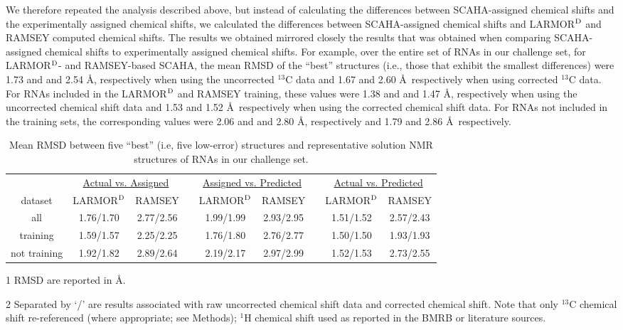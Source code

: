 \documentclass[journal=jcisd8,manuscript=article,layout=onecolumn]{achemso}
\begin{document}
{We therefore repeated  the analysis described above, but instead of calculating the differences between SCAHA-assigned chemical shifts and the experimentally assigned chemical shifts, we calculated the differences between SCAHA-assigned chemical shifts and LARMOR$^{\rm D}$ and RAMSEY computed chemical shifts. The results we obtained mirrored closely the results that was obtained when comparing SCAHA-assigned chemical shifts to experimentally assigned chemical shifts. For example, over the entire set of RNAs in our challenge set, for LARMOR$^{\rm D}$- and RAMSEY-based SCAHA, the mean RMSD of the ``best'' structures (i.e., those that exhibit the smallest differences) were 1.73 and  and 2.54 \AA, respectively when using the uncorrected $^{13}$C data and 1.67 and 2.60 \AA\, respectively when using corrected $^{13}$C data. %
For RNAs included in the LARMOR$^{\rm D}$ and RAMSEY training, these values were 1.38 and  and 1.47 \AA, respectively when using the uncorrected chemical shift data and 1.53 and 1.52 \AA\, respectively when using the corrected chemical shift data. For RNAs not included in the training sets, the corresponding values were 2.06 and  and 2.80 \AA, respectively and 1.79 and 2.86 \AA\, respectively. 
\begin{table}[h!]
\centering
\caption{Mean RMSD between five ``best'' (i.e, five low-error) structures and representative solution NMR structures of RNAs in our challenge set.}
\begin{threeparttable}
\begin{tabular}{*9c}
\toprule
{} & \multicolumn{2}{c}{\underline{Actual vs. Assigned}} & {} & \multicolumn{2}{c}{\underline{Assigned vs. Predicted}} & {} & \multicolumn{2}{c}{\underline{Actual vs. Predicted}} \\
dataset & LARMOR$^{\rm D}$   & RAMSEY   & {} & LARMOR$^{\rm D}$  & RAMSEY   & {} & LARMOR$^{\rm D}$    & RAMSEY \\

\hline
all & 1.76/1.70 & 2.77/2.56 & {} & 1.99/1.99 & 2.93/2.95 & {} & 1.51/1.52 & 2.57/2.43 \\
training & 1.59/1.57 & 2.25/2.25 & {} & 1.76/1.80 & 2.76/2.77 & {} & 1.50/1.50 & 1.93/1.93 \\
not training & 1.92/1.82 & 2.89/2.64 & {} & 2.19/2.17 & 2.97/2.99 & {} & 1.52/1.53 & 2.73/2.55 \\
\hline
\end{tabular}
\begin{tablenotes}
\item[1] RMSD are reported in \AA.
\item[2] Separated by `/' are  results associated with raw uncorrected chemical shift data and corrected chemical shift. Note that only $^{13}$C chemical shift re-referenced (where appropriate; see Methods); $^{1}$H chemical shift used as reported in the BMRB or literature sources.  
\end{tablenotes}
\end{threeparttable}
\label{tab:meanrsmd} 
\end{table}

}
\end{document}
